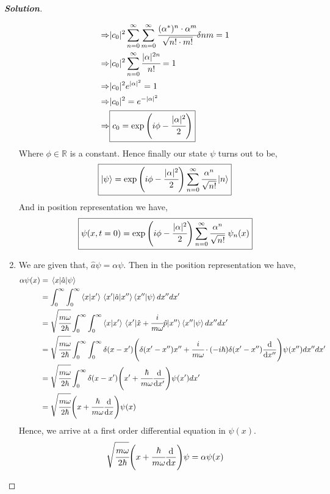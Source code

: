 \documentclass[10pt]{scrartcl}
\theoremstyle{definition}
\newenvironment{solution} {\begin{proof}[\normalfont \textbf{Solution}]} {\end{proof}}
\newcommand{\rn}{\mathbb{R}}
\newcommand*{\Op}{\hat{p}}
\newcommand*{\Ox}{\hat{x}}
\newcommand*{\Oa}{\hat{a}}
\begin{document}
\begin{solution}
\begin{enumerate}[label=(\alph*)]
\begin{align*}
                \Rightarrow &|c_0|^2 \sum_{n = 0}^{\infty} \sum_{m = 0}^{\infty} \cfrac{(\alpha^*)^n \cdot \alpha^m}{\sqrt{n! \cdot m!}} \delta{nm}  = 1\\
                \Rightarrow &|c_0|^2 \sum_{n = 0}^{\infty} \cfrac{|\alpha|^{2n}}{n!} = 1\\
                \Rightarrow &|c_0|^2 e^{|\alpha|^2} = 1 \\ 
                \Rightarrow &|c_0|^2 = e^{-|\alpha|^2} \\
                \Rightarrow &\boxed{c_0 = \exp\qty(i\phi - \cfrac{|\alpha|^2}{2})}
            \end{align*}
            Where $\phi \in \rn$ is a constant. Hence finally our state $\psi$ turns out to be, 
            $$\boxed{\ket\psi = \exp\qty(i\phi - \cfrac{|\alpha|^2}{2}) \sum_{n = 0}^{\infty} \cfrac{\alpha^n}{\sqrt{n!}}\ket n}$$
            And in position representation we have,
            $$\boxed{\psi(x, t = 0) = \exp\qty(i\phi - \cfrac{|\alpha|^2}{2}) \sum_{n = 0}^{\infty} \cfrac{\alpha^n}{\sqrt{n!}} ~ \psi_n(x)}$$
        \item We are given that, $\Oa \psi = \alpha \psi$. Then in the position representation we have,
            \begin{align*}
                \alpha \psi(x) &= \mel{x}{\Oa}{\psi}\\ 
                               &= \int_0^\infty \int_0^\infty \ip{x}{x'}\mel{x'}{\Oa}{x''}\ip{x''}{\psi} dx'' dx' \\ 
                               &= \sqrt{\cfrac{m\omega}{2\hbar}}\int_0^\infty \int_0^\infty \ip{x}{x'}\mel{x'}{\Ox + \cfrac{i}{m\omega}\Op}{x''}\ip{x''}{\psi} dx'' dx' \\ 
                               &= \sqrt{\cfrac{m\omega}{2\hbar}}\int_0^\infty \int_0^\infty \delta(x - x')\qty(\delta(x'-x'')x'' + \cfrac{i}{m\omega}\cdot \qty(-i\hbar) \delta(x'-x'')\dv{x''})\psi(x'') dx'' dx' \\ 
                               &= \sqrt{\cfrac{m\omega}{2\hbar}}\int_0^\infty \delta(x -x')\qty(x' + \cfrac{\hbar}{m\omega}\dv{x'})\psi(x') dx' \\ 
                               &= \sqrt{\cfrac{m\omega}{2\hbar}}\qty(x + \cfrac{\hbar}{m\omega}\dv{x})\psi(x) \\ 
            \end{align*}
            Hence, we arrive at a first order differential equation in $\psi(x)$.
            \begin{align*}
                &\sqrt{\cfrac{m\omega}{2\hbar}}\qty(x + \cfrac{\hbar}{m\omega} \dv{x})\psi = \alpha \psi(x) \\

\end{align*}
\end{enumerate}
\end{solution}
\end{document}

